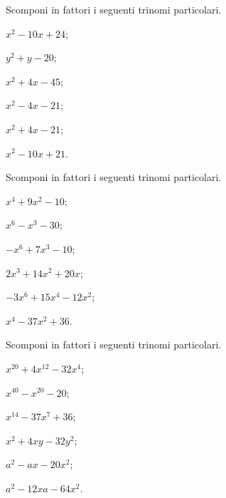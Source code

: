 \begin{esercizio}
 \label{ese:13.74}
 Scomponi in fattori i seguenti trinomi particolari.
 \begin{multicols}{3}
 \begin{enumeratea}
 \item $x^{2}-10x+24$;
 \item $y^{2}+y-20$;
 \item $x^{2}+4x-45$;
 \item $x^{2}-4x-21$;
 \item $x^{2}+4x-21$;
 \item $x^{2}-10x+21$.
 \end{enumeratea}
\end{multicols}
\end{esercizio}

\begin{esercizio}
 \label{ese:13.75}
 Scomponi in fattori i seguenti trinomi particolari.
 \begin{multicols}{3}
 \begin{enumeratea}
 \item $x^{4}+9x^{2}-10$;
 \item $x^{6}-x^{3}-30$;
 \item $-x^{6}+7x^{3}-10$;
 \item $2x^{3}+14x^{2}+20x$;
 \item $-3x^{6}+15x^{4}-12x^{2}$;
 \item $x^{4}-37x^{2}+36$.
 \end{enumeratea}
\end{multicols}
\end{esercizio}

\begin{esercizio}
 \label{ese:13.76}
 Scomponi in fattori i seguenti trinomi particolari.
 \begin{multicols}{3}
 \begin{enumeratea}
 \item $x^{20}+4x^{12}-32x^{4}$;
 \item $x^{40}-x^{20}-20$;
 \item $x^{14}-37x^{7}+36$;
 \item $x^{2}+4xy-32y^{2}$;
 \item $a^{2}-ax-20x^{2}$;
 \item $a^{2}-12xa-64x^{2}$.
 \end{enumeratea}
\end{multicols}
\end{esercizio}

